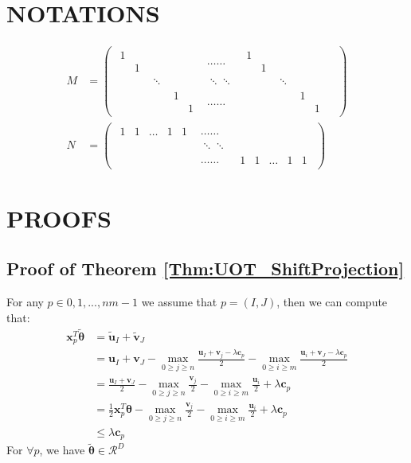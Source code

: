 \documentclass[twoside]{article}
\theoremstyle{plain}
\newcommand{\tranT}{T}
\renewcommand{\vec}[1]{\bm{#1}}
\begin{document}
\section{NOTATIONS}
\begin{align}
M &= 
\begin{pmatrix}
\begin{matrix} 1&\\&1 \end{matrix}& & &\dots\dots&\begin{matrix} 1&\\&1 \end{matrix}& & \\
&\ddots& & \ddots\ddots & & \ddots & & \\
& &\begin{matrix} 1&\\&1 \end{matrix}& \dots\dots& & &\begin{matrix} 1&\\&1 \end{matrix}
\end{pmatrix}\\
N &= 
\begin{pmatrix}
\begin{matrix} 1&1&\dots&1&1\end{matrix} &\dots\dots \\
&\ddots\ddots&\\
&\dots\dots & \begin{matrix} 1&1&\dots&1&1\end{matrix}
\end{pmatrix}
\end{align}
\section{PROOFS}
\subsection{Proof of Theorem \ref{Thm:UOT_ShiftProjection}}
For any $p \in {0,1,...,nm -1}$ we assume that $p = (I,J)$, then we can compute that:
 \begin{equation}
\begin{split} 
\vec{x}_p^{\tranT}\tilde{\vec{\theta}} &= \tilde{\vec{u}}_{I} + \tilde{\vec{v}}_J \\
				    &= {\vec{u}}_{I} + {\vec{v}}_J - \max_{0\geq j\geq n} \frac{{\vec{u}}_I +{\vec{v}}_j - \lambda \vec{c}_{p}}{2} - \max_{0 \geq i \geq m} \frac{{\vec{u}}_i +{\vec{v}}_J - \lambda \vec{c}_{p}}{2}\\
				    &= \frac{{\vec{u}}_{I} + {\vec{v}}_J}{2} - \max_{0\geq j\geq n} \frac{{\vec{v}}_j}{2} - \max_{0 \geq i \geq m} \frac{{\vec{u}}_i }{2} + \lambda \vec{c}_{p}\\
				    &= \frac{1}{2}\vec{x}_p^{\tranT}{\vec{\theta}} - \max_{0\geq j\geq n} \frac{{\vec{v}}_j}{2} - \max_{0 \geq i \geq m} \frac{{\vec{u}}_i }{2} +\lambda \vec{c}_{p} \\
				    &\leq \lambda \vec{c}_{p} 
 \end{split} 
\end{equation}
For $\forall p$, we have $\tilde{\vec{\theta}} \in \mathcal{R}^{D}$
\end{document}
